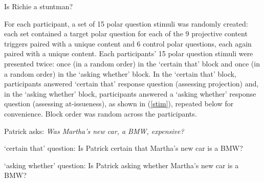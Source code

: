\documentclass[11pt,fleqn]{article}
\newcommand{\6}{\mbox{$[\hspace*{-.6mm}[$}}
\newcommand{\9}{\mbox{$]\hspace*{-.6mm}]$}}
\begin{document}
\begin{exe}
\ex\label{control} Is Richie a stuntman?
\end{exe}

For each participant, a set of 15 polar question stimuli was randomly created: each set contained a target polar question for each of the 9 projective content triggers paired with a unique content and 6 control polar questions, each again paired with a unique content. Each participants' 15 polar question stimuli were presented twice: once (in a random order) in the `certain that' block and once (in a random order) in the `asking whether' block. In the `certain that' block, participants answered `certain that' response question (assessing projection) and, in the `asking whether' block, participants answered a `asking whether' response question (assessing at-issueness), as shown in (\ref{stim}), repeated below for convenience. Block order was random across the participants.

\begin{exe}

\exi{(\ref{stim})} Patrick asks: {\em Was Martha's new car, a BMW, expensive?} 

\begin{xlist}
\ex `certain that' question: Is Patrick certain that Martha's new car is a BMW?

\ex `asking whether' question: Is Patrick asking whether Martha's new car is a BMW?

\end{xlist}

\end{exe}
\end{document}
